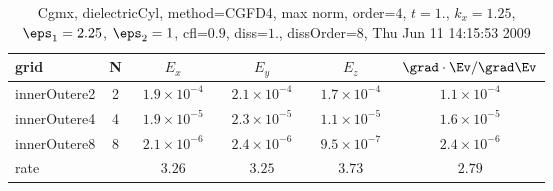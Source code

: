 \begin{table}[hbt]\tableFont %
\begin{center}
\begin{tabular}{|l|c|c|c|c|c|} \hline 
grid  & N &  $E_x$ &  $E_y$ & $E_z$ & $\grad\cdot\Ev/\grad\Ev$\\ \hline 
        innerOutere2 &     2 & ~$1.9\times10^{ -4}$~ & ~$2.1\times10^{ -4}$~ & ~$1.7\times10^{ -4}$~ & ~$1.1\times10^{ -4}$~  \\ \hline
        innerOutere4 &     4 & ~$1.9\times10^{ -5}$~ & ~$2.3\times10^{ -5}$~ & ~$1.1\times10^{ -5}$~ & ~$1.6\times10^{ -5}$~  \\ \hline
        innerOutere8 &     8 & ~$2.1\times10^{ -6}$~ & ~$2.4\times10^{ -6}$~ & ~$9.5\times10^{ -7}$~ & ~$2.4\times10^{ -6}$~  \\ \hline
    rate             &       &       $3.26$          &       $3.25$          &       $3.73$          &       $2.79$           \\ \hline
\end{tabular}
\caption{Cgmx, dielectricCyl, method=CGFD4, max norm, order=$4$, $t=1.$, $k_x=1.25$, $\eps_1=2.25$, $\eps_2=1$, cfl=$0.9$, diss=$1.$, dissOrder=$8$, Thu Jun 11 14:15:53 2009}\label{table:dielectricCylNFDTDOrder4max}
\end{center}
\end{table}
